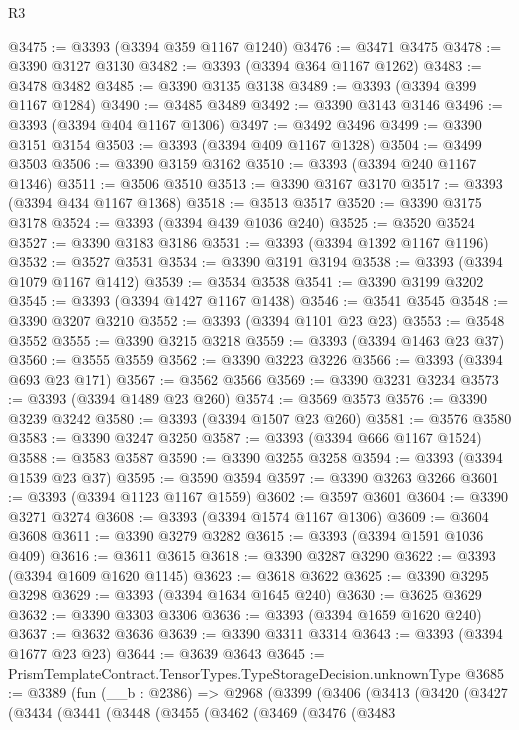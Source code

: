 \begin{lexlean}{R3}
\begin{coremodule}
@3475 := @3393 (@3394 @359 @1167 @1240)
@3476 := @3471 @3475
@3478 := @3390 @3127 @3130
@3482 := @3393 (@3394 @364 @1167 @1262)
@3483 := @3478 @3482
@3485 := @3390 @3135 @3138
@3489 := @3393 (@3394 @399 @1167 @1284)
@3490 := @3485 @3489
@3492 := @3390 @3143 @3146
@3496 := @3393 (@3394 @404 @1167 @1306)
@3497 := @3492 @3496
@3499 := @3390 @3151 @3154
@3503 := @3393 (@3394 @409 @1167 @1328)
@3504 := @3499 @3503
@3506 := @3390 @3159 @3162
@3510 := @3393 (@3394 @240 @1167 @1346)
@3511 := @3506 @3510
@3513 := @3390 @3167 @3170
@3517 := @3393 (@3394 @434 @1167 @1368)
@3518 := @3513 @3517
@3520 := @3390 @3175 @3178
@3524 := @3393 (@3394 @439 @1036 @240)
@3525 := @3520 @3524
@3527 := @3390 @3183 @3186
@3531 := @3393 (@3394 @1392 @1167 @1196)
@3532 := @3527 @3531
@3534 := @3390 @3191 @3194
@3538 := @3393 (@3394 @1079 @1167 @1412)
@3539 := @3534 @3538
@3541 := @3390 @3199 @3202
@3545 := @3393 (@3394 @1427 @1167 @1438)
@3546 := @3541 @3545
@3548 := @3390 @3207 @3210
@3552 := @3393 (@3394 @1101 @23 @23)
@3553 := @3548 @3552
@3555 := @3390 @3215 @3218
@3559 := @3393 (@3394 @1463 @23 @37)
@3560 := @3555 @3559
@3562 := @3390 @3223 @3226
@3566 := @3393 (@3394 @693 @23 @171)
@3567 := @3562 @3566
@3569 := @3390 @3231 @3234
@3573 := @3393 (@3394 @1489 @23 @260)
@3574 := @3569 @3573
@3576 := @3390 @3239 @3242
@3580 := @3393 (@3394 @1507 @23 @260)
@3581 := @3576 @3580
@3583 := @3390 @3247 @3250
@3587 := @3393 (@3394 @666 @1167 @1524)
@3588 := @3583 @3587
@3590 := @3390 @3255 @3258
@3594 := @3393 (@3394 @1539 @23 @37)
@3595 := @3590 @3594
@3597 := @3390 @3263 @3266
@3601 := @3393 (@3394 @1123 @1167 @1559)
@3602 := @3597 @3601
@3604 := @3390 @3271 @3274
@3608 := @3393 (@3394 @1574 @1167 @1306)
@3609 := @3604 @3608
@3611 := @3390 @3279 @3282
@3615 := @3393 (@3394 @1591 @1036 @409)
@3616 := @3611 @3615
@3618 := @3390 @3287 @3290
@3622 := @3393 (@3394 @1609 @1620 @1145)
@3623 := @3618 @3622
@3625 := @3390 @3295 @3298
@3629 := @3393 (@3394 @1634 @1645 @240)
@3630 := @3625 @3629
@3632 := @3390 @3303 @3306
@3636 := @3393 (@3394 @1659 @1620 @240)
@3637 := @3632 @3636
@3639 := @3390 @3311 @3314
@3643 := @3393 (@3394 @1677 @23 @23)
@3644 := @3639 @3643
@3645 := PrismTemplateContract.TensorTypes.TypeStorageDecision.unknownType
@3685 := @3389
    (fun (__b : @2386) =>
    @2968
      (@3399
        (@3406
          (@3413
            (@3420
              (@3427
                (@3434
                  (@3441
                    (@3448
                      (@3455
                        (@3462
                          (@3469
                            (@3476
                              (@3483

\end{coremodule}
\end{lexlean}
